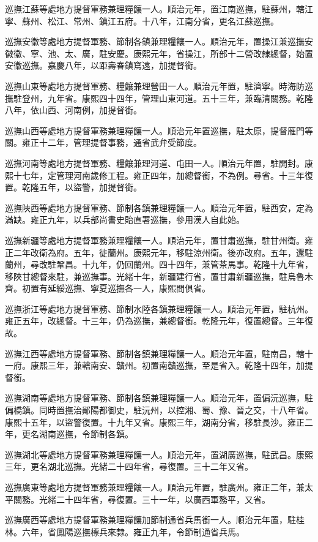 \begin{pinyinscope}
巡撫江蘇等處地方提督軍務兼理糧饟一人。順治元年，置江南巡撫，駐蘇州，轄江寧、蘇州、松江、常州、鎮江五府。十八年，江南分省，更名江蘇巡撫。

巡撫安徽等處地方提督軍務、節制各鎮兼理糧饟一人。順治元年，置操江兼巡撫安徽徽、寧、池、太、廣，駐安慶。康熙元年，省操江，所部十二營改隸總督，始置安徽巡撫。嘉慶八年，以距壽春鎮窵遠，加提督銜。

巡撫山東等處地方提督軍務、糧饟兼理營田一人。順治元年置，駐濟寧。時海防巡撫駐登州，九年省。康熙四十四年，管理山東河道。五十三年，兼臨清關務。乾隆八年，依山西、河南例，加提督銜。

巡撫山西等處地方提督軍務兼理糧饟一人。順治元年置巡撫，駐太原，提督雁門等關。雍正十二年，管理提督事務，通省武弁受節度。

巡撫河南等處地方提督軍務、糧饟兼理河道、屯田一人。順治元年置，駐開封。康熙十七年，定管理河南歲修工程。雍正四年，加總督銜，不為例。尋省。十三年復置。乾隆五年，以盜警，加提督銜。

巡撫陜西等處地方提督軍務、節制各鎮兼理糧饟一人。順治元年置，駐西安，定為滿缺。雍正九年，以兵部尚書史貽直署巡撫，參用漢人自此始。

巡撫新疆等處地方提督軍務兼理糧饟一人。順治元年，置甘肅巡撫，駐甘州衛。雍正二年改衛為府。五年，徙蘭州。康熙元年，移駐涼州衛。後亦改府。五年，還駐蘭州，尋改駐鞏昌。十九年，仍回蘭州。四十四年，兼管茶馬事。乾隆十九年省，移陜甘總督來駐，兼巡撫事。光緒十年，新疆建行省，置甘肅新疆巡撫，駐烏魯木齊。初置有延綏巡撫、寧夏巡撫各一人，康熙間俱省。

巡撫浙江等處地方提督軍務、節制水陸各鎮兼理糧饟一人。順治元年置，駐杭州。雍正五年，改總督。十三年，仍為巡撫，兼總督銜。乾隆元年，復置總督。三年復故。

巡撫江西等處地方提督軍務、節制各鎮兼理糧饟一人。順治元年置，駐南昌，轄十一府。康熙三年，兼轄南安、贛州。初置南贛巡撫，至是省入。乾隆十四年，加提督銜。

巡撫湖南等處地方提督軍務、節制各鎮兼理糧饟一人。順治元年，置偏沅巡撫，駐偏橋鎮。同時置撫治鄖陽都御史，駐沅州，以控湘、蜀、豫、晉之交，十八年省。康熙十五年，以盜警復置。十九年又省。康熙三年，湖南分省，移駐長沙。雍正二年，更名湖南巡撫，令節制各鎮。

巡撫湖北等處地方提督軍務兼理糧饟一人。順治元年，置湖廣巡撫，駐武昌。康熙三年，更名湖北巡撫。光緒二十四年省，尋復置。三十二年又省。

巡撫廣東等處地方提督軍務兼理糧饟一人。順治元年置，駐廣州。雍正二年，兼太平關務。光緒二十四年省，尋復置。三十一年，以廣西軍務平，又省。

巡撫廣西等處地方提督軍務兼理糧饟加節制通省兵馬銜一人。順治元年置，駐桂林。六年，省鳳陽巡撫標兵來隸。雍正九年，令節制通省兵馬。


\end{pinyinscope}
